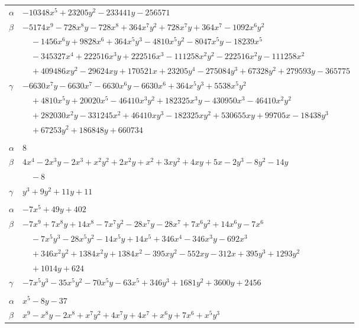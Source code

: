 \documentclass[11pt]{article}
\begin{document}
\begin{longtable}{@{}ll@{}}
$\alpha$ & $-10348x^{5}+23205y^{2}-233441y-256571$\\
$\beta$ & $-5174x^{9}-728x^{8}y-728x^{8}+364x^{7}y^{2}+728x^{7}y+364x^{7}-1092x^{6}y^{2}$\\
 & $\quad -1456x^{6}y+9828x^{6}+364x^{5}y^{3}-4810x^{5}y^{2}-8047x^{5}y-18239x^{5}$\\
 & $\quad -345327x^{4}+222516x^{3}y+222516x^{3}-111258x^{2}y^{2}-222516x^{2}y-111258x^{2}$\\
 & $\quad +409486xy^{2}-29624xy+170521x+23205y^{4}-275084y^{3}+67328y^{2}+279593y-365775$\\
$\gamma$ & $-6630x^{7}y-6630x^{7}-6630x^{6}y-6630x^{6}+364x^{5}y^{3}+5538x^{5}y^{2}$\\
 & $\quad +4810x^{5}y+20020x^{5}-46410x^{3}y^{2}+182325x^{3}y-430950x^{3}-46410x^{2}y^{2}$\\
 & $\quad +282030x^{2}y-331245x^{2}+46410xy^{3}-182325xy^{2}+530655xy+99705x-18438y^{3}$\\
 & $\quad +67253y^{2}+186848y+660734$\\
\addlinespace[3pt]
\multicolumn{2}{@{}l}{$\{i,j\}=\{13,33\}$, $k_{ij}=2^{3}\cdot 5$}\\
$\alpha$ & $8$\\
$\beta$ & $4x^{4}-2x^{3}y-2x^{3}+x^{2}y^{2}+2x^{2}y+x^{2}+3xy^{2}+4xy+5x-2y^{3}-8y^{2}-14y$\\
 & $\quad -8$\\
$\gamma$ & $y^{3}+9y^{2}+11y+11$\\
\addlinespace[3pt]
\multicolumn{2}{@{}l}{$\{i,j\}=\{14,19\}$, $k_{ij}=2^{3}\cdot 3^{2}\cdot 5$}\\
$\alpha$ & $-7x^{5}+49y+402$\\
$\beta$ & $-7x^{9}+7x^{8}y+14x^{8}-7x^{7}y^{2}-28x^{7}y-28x^{7}+7x^{6}y^{2}+14x^{6}y-7x^{6}$\\
 & $\quad -7x^{5}y^{3}-28x^{5}y^{2}-14x^{5}y+14x^{5}+346x^{4}-346x^{3}y-692x^{3}$\\
 & $\quad +346x^{2}y^{2}+1384x^{2}y+1384x^{2}-395xy^{2}-552xy-312x+395y^{3}+1293y^{2}$\\
 & $\quad +1014y+624$\\
$\gamma$ & $-7x^{5}y^{3}-35x^{5}y^{2}-70x^{5}y-63x^{5}+346y^{3}+1681y^{2}+3600y+2456$\\
\addlinespace[3pt]
\multicolumn{2}{@{}l}{$\{i,j\}=\{14,22\}$, $k_{ij}=2\cdot 3\cdot 17$}\\
$\alpha$ & $x^{5}-8y-37$\\
$\beta$ & $x^{9}-x^{8}y-2x^{8}+x^{7}y^{2}+4x^{7}y+4x^{7}+x^{6}y+7x^{6}+x^{5}y^{3}$\\

\end{longtable}
\end{document}
